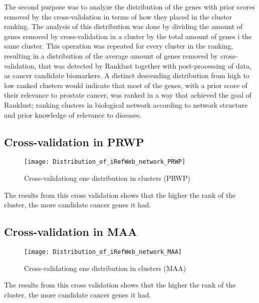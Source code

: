 The second purpose was to analyze the distribution of the genes with prior
scores removed by the cross-validation in terms of how they placed in the
cluster ranking. The analysis of this distribution was done by dividing the
amount of genes removed by cross-validation in a cluster by the total amount of
genes i the same cluster. This operation was repeated for every cluster in the
ranking, resulting in a distribution of the average amount of genes removed by
cross-validation, that was detected by Ranklust together with post-processing of
data, as cancer candidate biomarkers. A distinct descending distribution from
high to low ranked clusters would indicate that most of the genes, with a prior
score of their relevance to prostate cancer, was ranked in a way that achieved
the goal of Ranklust; ranking clusters in biological network according to
network structure and prior knowledge of relevance to diseases.

\subsection{Cross-validation in PRWP}
\begin{figure}[H]
    \caption{Cross-validationg ene distribution in clusters (PRWP)}
    \label{fig:irefweb-prwp}
    \texttt{[image: Distribution\_of\_iRefWeb\_network\_PRWP]}
\end{figure}
The results from this cross validation shows that the higher the rank of the
cluster, the more candidate cancer genes it had.

\subsection{Cross-validation in MAA}
\begin{figure}[H]
    \caption{Cross-validationg ene distribution in clusters (MAA)}
    \label{fig:irefweb-maa}
    \texttt{[image: Distribution\_of\_iRefWeb\_network\_MAA]}
\end{figure}
The results from this cross validation shows that the higher the rank of the
cluster, the more candidate cancer genes it had.

